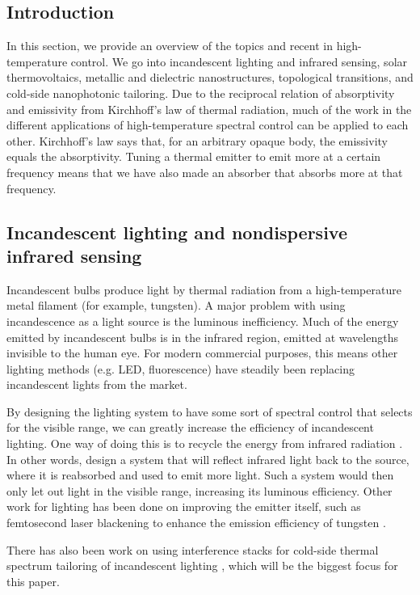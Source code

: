 \documentclass[%
 reprint,
 amsmath,amssymb,
 aps
]{revtex4-2}
\begin{document}
\subsection{Introduction}
In this section, we provide an overview of the topics and recent in high-temperature control. We go into incandescent lighting and infrared sensing, solar thermovoltaics, metallic and dielectric nanostructures, topological transitions, and cold-side nanophotonic tailoring. Due to the reciprocal relation of absorptivity and emissivity from Kirchhoff's law of thermal radiation, much of the work in the different applications of high-temperature spectral control can be applied to each other. Kirchhoff's law says that, for an arbitrary opaque body, the emissivity equals the absorptivity. Tuning a thermal emitter to emit more at a certain frequency means that we have also made an absorber that absorbs more at that frequency.


\subsection{Incandescent lighting and nondispersive infrared sensing}
Incandescent bulbs produce light by thermal radiation from a high-temperature metal filament (for example, tungsten). A major problem with using incandescence as a light source is the luminous inefficiency. Much of the energy emitted by incandescent bulbs is in the infrared region, emitted at wavelengths invisible to the human eye. For modern commercial purposes, this means other lighting methods (e.g. LED, fluorescence) have steadily been replacing incandescent lights from the market. 

By designing the lighting system to have some sort of spectral control that selects for the visible range, we can greatly increase the efficiency of incandescent lighting. One way of doing this is to recycle the energy from infrared radiation \cite{heat_mirror}. In other words, design a system that will reflect infrared light back to the source, where it is reabsorbed and used to emit more light. Such a system would then only let out light in the visible range, increasing its luminous efficiency. Other work for lighting has been done on improving the emitter itself, such as femtosecond laser blackening to enhance the emission efficiency of tungsten \cite{femto}.

There has also been work on using interference stacks for cold-side thermal spectrum tailoring of incandescent lighting \cite{ilic, view_factor_1, view_factor_2}, which will be the biggest focus for this paper. 
\end{document}
